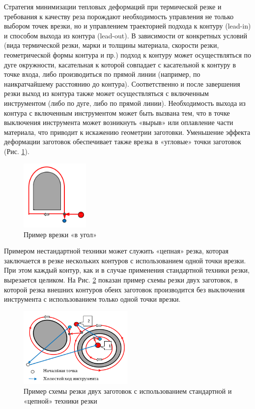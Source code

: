 \documentclass[12pt,twoside]{report}
\newcounter{cor}
\begin{document}
Стратегия минимизации тепловых деформаций при термической резке
и требования к качеству реза порождают необходимость управления
не только выбором точек врезки,
но и управлением траекторией подхода к контуру (lead-in)
и способом выхода из контура (lead-out).
В зависимости от конкретных условий
(вида термической резки, марки и толщины материала,
скорости резки, геометрической формы контура и пр.)
подход к контуру может осуществляться по дуге окружности,
касательная к которой совпадает с касательной к контуру в точке входа,
либо производиться по прямой линии
(например, по наикратчайшему расстоянию до контура).
Соответственно и после завершения резки выход из контура
также может осуществляться с включенным инструментом
(либо по дуге, либо по прямой линии).
Необходимость выхода из контура с включенным
инструментом может быть вызвана тем,
что в точке выключения инструмента может возникнуть
«вырыв» или оплавление части материала,
что приводит к искажению геометрии заготовки.
Уменьшение эффекта деформации заготовок обеспечивает
также врезка в «угловые» точки заготовок
(Рис. \ref{corner}).

\begin{figure}
  \begin{center}
  \includegraphics[width=0.3\textwidth]{corner.png}
  \caption{Пример врезки «в угол»}
  \label{corner}
  \end{center}
\end{figure}

Примером нестандартной техники
может служить «цепная» резка,
которая заключается в резке нескольких контуров с
использованием одной точки врезки.
При этом каждый контур,
как и в случае применения стандартной техники резки,
вырезается целиком.
На Рис. \ref{chain}
показан пример схемы резки двух заготовок,
в которой резка внешних контуров обеих заготовок
производится без выключения инструмента
с использованием только одной точки врезки.

\begin{figure}
  \begin{center}
  \includegraphics[width=0.5\textwidth]{chain.png}
  \caption{Пример схемы резки двух заготовок с использованием стандартной и «цепной» техники резки}
  \label{chain}
  \end{center}
\end{figure}
\end{document}
